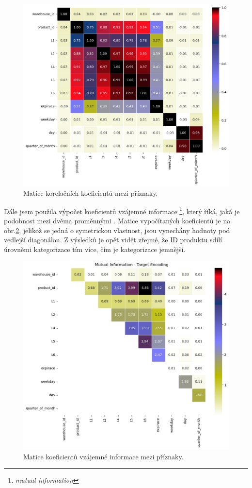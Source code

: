 \begin{figure}[hbtp!]
    \centering
    \includegraphics[width=.8\textwidth]{obrazky/zntb/pearson.png}
    \caption{Matice korelačních koeficientů mezi příznaky.}
    \label{obr:nb:pearson}
\end{figure}

Dále jsem použila výpočet koeficientů vzájemné informace \footnote{\emph{mutual information}}, který říká, jaká je podobnost mezi dvěma proměnnými \cite{bib:scikit}. %
Matice vypočítaných koeficientů je na obr.\ref*{obr:nb:MI}, jelikož se jedná o symetrickou vlastnost, jsou vynechány hodnoty pod vedlejší diagonálou. Z výsledků je opět vidět zřejmé, že ID produktu sdílí úrovněmi kategorizace tím více, čím je kategorizace jemnější.

\begin{figure}[hbtp!]
    \centering
    \includegraphics[width=.8\textwidth]{obrazky/zntb/MI_TE.png}
    \caption{Matice koeficientů vzájemné informace mezi příznaky.}
    \label{obr:nb:MI}
\end{figure}

